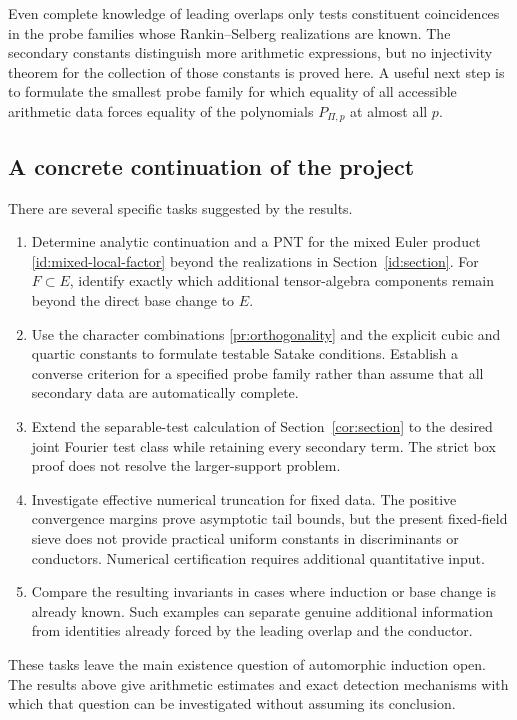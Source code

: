 \documentclass[11pt,reqno]{amsart}
\numberwithin{equation}{section}
\theoremstyle{definition}
\theoremstyle{remark}
\begin{document}
Even complete knowledge of leading overlaps only tests constituent coincidences in the probe families whose Rankin--Selberg realizations are known. The secondary constants distinguish more arithmetic expressions, but no injectivity theorem for the collection of those constants is proved here. A useful next step is to formulate the smallest probe family for which equality of all accessible arithmetic data forces equality of the polynomials $P_{\Pi,p}$ at almost all $p$.

\subsection{A concrete continuation of the project}
There are several specific tasks suggested by the results.
\begin{enumerate}[label=\textup{(\arabic*)},leftmargin=*]
\item Determine analytic continuation and a PNT for the mixed Euler product \eqref{id:mixed-local-factor} beyond the realizations in Section~\ref{id:section}. For $F\subset E$, identify exactly which additional tensor-algebra components remain beyond the direct base change to $E$.
\item Use the character combinations \eqref{pr:orthogonality} and the explicit cubic and quartic constants to formulate testable Satake conditions. Establish a converse criterion for a specified probe family rather than assume that all secondary data are automatically complete.
\item Extend the separable-test calculation of Section~\ref{cor:section} to the desired joint Fourier test class while retaining every secondary term. The strict box proof does not resolve the larger-support problem.
\item Investigate effective numerical truncation for fixed data. The positive convergence margins prove asymptotic tail bounds, but the present fixed-field sieve does not provide practical uniform constants in discriminants or conductors. Numerical certification requires additional quantitative input.
\item Compare the resulting invariants in cases where induction or base change is already known. Such examples can separate genuine additional information from identities already forced by the leading overlap and the conductor.
\end{enumerate}
These tasks leave the main existence question of automorphic induction open. The results above give arithmetic estimates and exact detection mechanisms with which that question can be investigated without assuming its conclusion.
\end{document}
